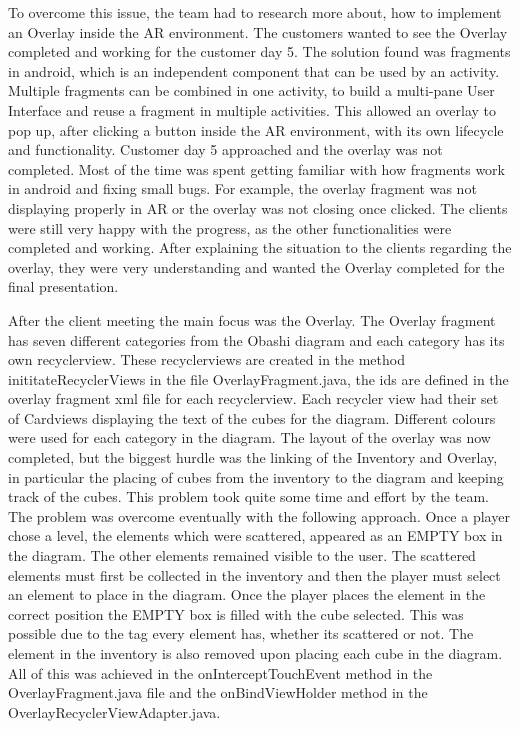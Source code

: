 \documentclass{l3proj}
\begin{document}
To overcome this issue, the team had to research more about, how to implement an Overlay
inside the AR environment. The customers wanted to see the Overlay completed and working for 
the customer day 5. The solution found was fragments in android, which is an independent 
component that can be used by an activity. Multiple fragments can be combined in one activity, 
to build a multi-pane User Interface and reuse a fragment in multiple activities\cite{Fragments}. 
This allowed an overlay to pop up, after clicking a button inside the AR environment, with its 
own lifecycle and functionality. Customer day 5 approached and the overlay was not completed. 
Most of the time was spent getting familiar with how fragments work in android and fixing small 
bugs. For example, the overlay fragment was not displaying properly in AR or the overlay was 
not closing once clicked. The clients were still very happy with the progress, as the other 
functionalities were completed and working. After explaining the situation to the clients 
regarding the overlay, they were very understanding and wanted the Overlay completed for the 
final presentation. 

After the client meeting the main focus was the Overlay. The Overlay fragment has seven different 
categories from the Obashi diagram and each category has its own recyclerview\cite{Recyclerviews}. 
These recyclerviews are created in the method inititateRecyclerViews in the file OverlayFragment.java, 
the ids\cite{ID's} are defined in the overlay fragment xml file for each recyclerview. Each recycler 
view had their set of Cardviews displaying the text of the cubes for the diagram. Different colours 
were used for each category in the diagram. The layout of the overlay was now completed, but the 
biggest hurdle was the linking of the Inventory and Overlay, in particular the placing of cubes 
from the inventory to the diagram and keeping track of the cubes. This problem took quite some time 
and effort by the team. The problem was overcome eventually with the following approach. Once a 
player chose a level, the elements which were scattered, appeared as an EMPTY box in the diagram. 
The other elements remained visible to the user. The scattered elements must first be collected in 
the inventory and then the player must select an element to place in the diagram. Once the player 
places the element in the correct position the EMPTY box is filled with the cube selected. This was 
possible due to the tag\cite{Tags} every element has, whether its scattered or not. The element in 
the inventory is also removed upon placing each cube in the diagram. All of this was achieved in the 
onInterceptTouchEvent method in the OverlayFragment.java file and the onBindViewHolder method in 
the OverlayRecyclerViewAdapter.java.
\end{document}
